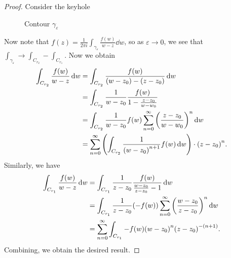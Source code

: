 \documentclass[leqno, openany]{memoir}
\theoremstyle{definition}
\theoremstyle{remark}
\theoremstyle{plain}
\theoremstyle{definition}
\theoremstyle{remark}
\newcommand{\ep}{\varepsilon}
\begin{document}
\begin{proof}
    Consider the keyhole
    \begin{figure}[H]
    \begin{center}
    \end{center}
    \caption{Contour $\gamma_{\ep}$}%
    \label{fig:}
    \end{figure}
    Now note that $f(z) = \frac{1}{2 \pi i} \int_{\gamma_{\ep}} \frac{f(w)}{w-z} \dd{w}$, so as $\ep \to 0$, we see that $\int_{\gamma_{\ep}} \to \int_{C_{r_2}} - \int_{C_{r_1}}$. Now we obtain
    \begin{align*}
        \int_{C_{r_2}} \frac{f(w)}{w-z} \dd{w} &= \int_{C_{r_2}} \frac{f(w)}{(w-z_0) - (z-z_0)} \dd{w} \\
                                               &= \int_{C_{r_2}} \frac{1}{w-z_0} \frac{f(w)}{1 - \frac{z-z_0}{w-w_0}} \\
                                               &= \int_{C_{r_2}} \frac{1}{w-z_0} f(w) \sum_{n=0}^{\infty} {\qty(\frac{z-z_0}{w-w_0})}^n \dd{w} \\
                                               &= \sum_{n=0}^{\infty} \qty(\int_{C_{r_2}} \frac{1}{{(w-z_0)}^{n+1}} f(w) \dd{w}) \cdot {(z-z_0)}^n.
    \end{align*}
    Similarly, we have 
    \begin{align*}
        \int_{C_{r_1}} \frac{f(w)}{w-z} \dd{w} &= \int_{C_{r_1}} \frac{1}{z-z_0} \frac{f(w)}{\frac{w-z_0}{z-z_0}-1} \dd{w} \\
                                               &= \int_{C_{r_1}} \frac{1}{z-z_0} (-f(w)) \sum_{n=0}^{\infty} {\qty(\frac{w-z_0}{z-z_0})}^n \dd{w} \\
                                               &= \sum_{n=0}^{\infty} \int_{C_{r_1}} -f(w) {(w-z_0)}^n {(z-z_0)}^{-(n+1)}.
    \end{align*}
    Combining, we obtain the desired result.
\end{proof}
\end{document}
